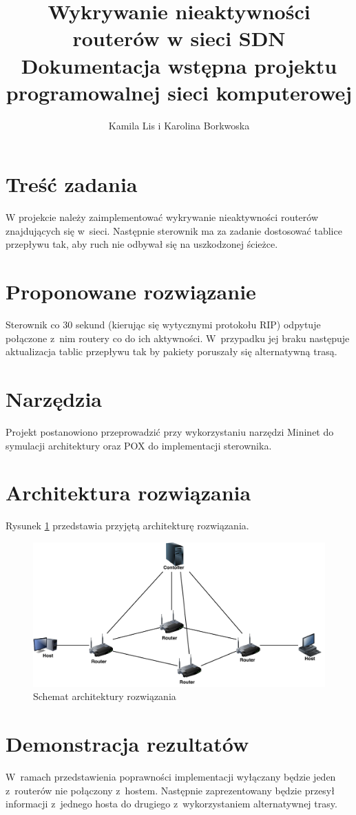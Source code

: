 \documentclass{article}
\date{}
\author{Kamila Lis i Karolina Borkwoska}
\title{Wykrywanie nieaktywności routerów w sieci SDN\\
	{\large Dokumentacja wstępna projektu programowalnej sieci komputerowej}}
\begin{document}
	\maketitle
	\section{Treść zadania}
	W projekcie należy zaimplementować wykrywanie nieaktywności routerów znajdujących się w~sieci. Następnie sterownik ma za zadanie dostosować tablice przepływu tak, aby ruch nie odbywał się na uszkodzonej ścieżce.
	\section{Proponowane rozwiązanie} 
	Sterownik co 30 sekund (kierując się wytycznymi protokołu RIP) odpytuje połączone z~nim routery co do ich aktywności. W~przypadku jej braku następuje aktualizacja tablic przepływu tak by pakiety poruszały się alternatywną trasą.
	\section{Narzędzia}
	Projekt postanowiono przeprowadzić przy wykorzystaniu narzędzi Mininet do symulacji architektury oraz POX do implementacji sterownika.
	\section{Architektura rozwiązania}
	Rysunek \ref{f:arch} przedstawia przyjętą architekturę rozwiązania. 
	\begin{figure}[H]
		\centering
		\includegraphics[scale = 0.60]{../images/psik_topology.pdf}
		\caption{Schemat architektury rozwiązania}
		\label{f:arch}
	\end{figure}	
	\section{Demonstracja rezultatów}
	W~ramach przedstawienia poprawności implementacji wyłączany będzie jeden z~routerów nie połączony z~hostem. Następnie zaprezentowany będzie przesył informacji z~jednego hosta do drugiego z~wykorzystaniem alternatywnej trasy. 
\end{document}
